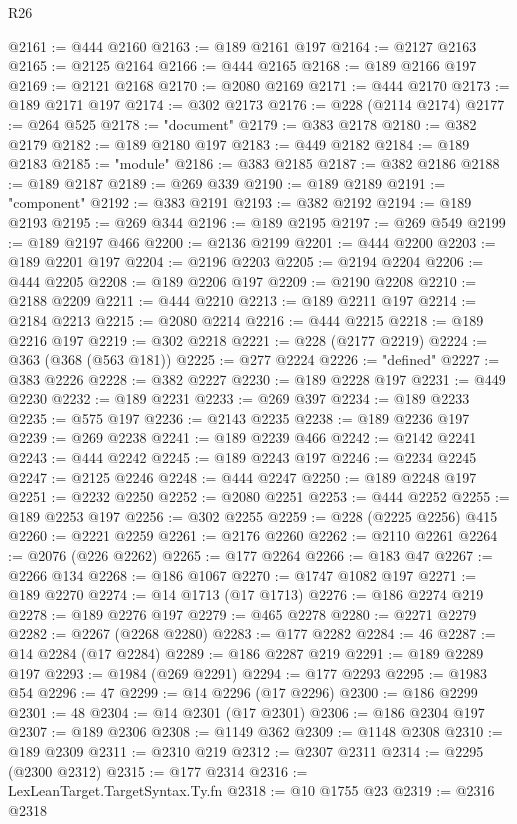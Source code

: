\begin{lexlean}{R26}
\begin{coremodule}
@2161 := @444 @2160
@2163 := @189 @2161 @197
@2164 := @2127 @2163
@2165 := @2125 @2164
@2166 := @444 @2165
@2168 := @189 @2166 @197
@2169 := @2121 @2168
@2170 := @2080 @2169
@2171 := @444 @2170
@2173 := @189 @2171 @197
@2174 := @302 @2173
@2176 := @228 (@2114 @2174)
@2177 := @264 @525
@2178 := "document"
@2179 := @383 @2178
@2180 := @382 @2179
@2182 := @189 @2180 @197
@2183 := @449 @2182
@2184 := @189 @2183
@2185 := "module"
@2186 := @383 @2185
@2187 := @382 @2186
@2188 := @189 @2187
@2189 := @269 @339
@2190 := @189 @2189
@2191 := "component"
@2192 := @383 @2191
@2193 := @382 @2192
@2194 := @189 @2193
@2195 := @269 @344
@2196 := @189 @2195
@2197 := @269 @549
@2199 := @189 @2197 @466
@2200 := @2136 @2199
@2201 := @444 @2200
@2203 := @189 @2201 @197
@2204 := @2196 @2203
@2205 := @2194 @2204
@2206 := @444 @2205
@2208 := @189 @2206 @197
@2209 := @2190 @2208
@2210 := @2188 @2209
@2211 := @444 @2210
@2213 := @189 @2211 @197
@2214 := @2184 @2213
@2215 := @2080 @2214
@2216 := @444 @2215
@2218 := @189 @2216 @197
@2219 := @302 @2218
@2221 := @228 (@2177 @2219)
@2224 := @363 (@368 (@563 @181))
@2225 := @277 @2224
@2226 := "defined"
@2227 := @383 @2226
@2228 := @382 @2227
@2230 := @189 @2228 @197
@2231 := @449 @2230
@2232 := @189 @2231
@2233 := @269 @397
@2234 := @189 @2233
@2235 := @575 @197
@2236 := @2143 @2235
@2238 := @189 @2236 @197
@2239 := @269 @2238
@2241 := @189 @2239 @466
@2242 := @2142 @2241
@2243 := @444 @2242
@2245 := @189 @2243 @197
@2246 := @2234 @2245
@2247 := @2125 @2246
@2248 := @444 @2247
@2250 := @189 @2248 @197
@2251 := @2232 @2250
@2252 := @2080 @2251
@2253 := @444 @2252
@2255 := @189 @2253 @197
@2256 := @302 @2255
@2259 := @228 (@2225 @2256) @415
@2260 := @2221 @2259
@2261 := @2176 @2260
@2262 := @2110 @2261
@2264 := @2076 (@226 @2262)
@2265 := @177 @2264
@2266 := @183 @47
@2267 := @2266 @134
@2268 := @186 @1067
@2270 := @1747 @1082 @197
@2271 := @189 @2270
@2274 := @14 @1713 (@17 @1713)
@2276 := @186 @2274 @219
@2278 := @189 @2276 @197
@2279 := @465 @2278
@2280 := @2271 @2279
@2282 := @2267 (@2268 @2280)
@2283 := @177 @2282
@2284 := 46
@2287 := @14 @2284 (@17 @2284)
@2289 := @186 @2287 @219
@2291 := @189 @2289 @197
@2293 := @1984 (@269 @2291)
@2294 := @177 @2293
@2295 := @1983 @54
@2296 := 47
@2299 := @14 @2296 (@17 @2296)
@2300 := @186 @2299
@2301 := 48
@2304 := @14 @2301 (@17 @2301)
@2306 := @186 @2304 @197
@2307 := @189 @2306
@2308 := @1149 @362
@2309 := @1148 @2308
@2310 := @189 @2309
@2311 := @2310 @219
@2312 := @2307 @2311
@2314 := @2295 (@2300 @2312)
@2315 := @177 @2314
@2316 := LexLeanTarget.TargetSyntax.Ty.fn
@2318 := @10 @1755 @23
@2319 := @2316 @2318

\end{coremodule}
\end{lexlean}
